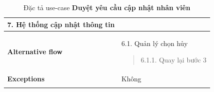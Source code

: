 \begin{longtable}{| p{} | p{} |}
                    7. Hệ thống cập nhật thông tin
                \\
                \hline
                    \textbf{Alternative flow}
                &
                6.1. Quản lý chọn hủy
                    \begin{quote} 
                    6.1.1. Quay lại bước 3
                    \end{quote}
                \\
                \hline
                    \textbf{Exceptions} 
                &
                    Không
                \\
                \hline
                \caption{Đặc tả use-case \textbf{Duyệt yêu cầu cập nhật nhân viên}}
            \end{longtable}

